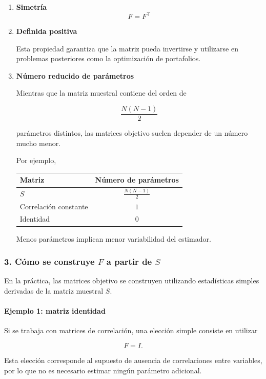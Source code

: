 \documentclass[letterpaper,12pt,oneside]{book}
\begin{document}
\begin{enumerate}
\item \textbf{Simetría}
\[
F = F^{\top}
\]

\item \textbf{Definida positiva}

Esta propiedad garantiza que la matriz pueda invertirse y utilizarse en problemas posteriores como la optimización de portafolios.

\item \textbf{Número reducido de parámetros}

Mientras que la matriz muestral contiene del orden de

\[
\frac{N(N-1)}{2}
\]

parámetros distintos, las matrices objetivo suelen depender de un número mucho menor.

Por ejemplo,

\begin{center}
\begin{tabular}{l c}
\hline
Matriz & Número de parámetros \\
\hline
$S$ & $\frac{N(N-1)}{2}$ \\
Correlación constante & $1$ \\
Identidad & $0$ \\
\hline
\end{tabular}
\end{center}

Menos parámetros implican menor variabilidad del estimador.
\end{enumerate}

\subsubsection*{3. Cómo se construye $F$ a partir de $S$}

En la práctica, las matrices objetivo se construyen utilizando estadísticas simples derivadas de la matriz muestral $S$.

\paragraph{Ejemplo 1: matriz identidad}

Si se trabaja con matrices de correlación, una elección simple consiste en utilizar

\[
F = I.
\]

Esta elección corresponde al supuesto de ausencia de correlaciones entre variables, por lo que no es necesario estimar ningún parámetro adicional.
\end{document}
